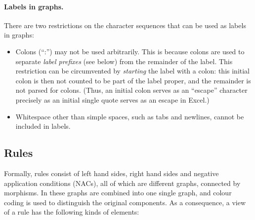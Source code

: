 \paragraph{Labels in graphs.}

There are two restrictions on the character sequences that can be used as
labels in graphs:
\begin{itemize}\noitemsep
\item Colons (``\textsf{:}'') may not be used arbitrarily. This is because
  colons are used to separate \emph{label prefixes} (see below) from the
  remainder of the label. This restriction can be circumvented by
  \emph{starting} the label with a colon: this initial colon is then not
  counted to be part of the label proper, and the remainder is not parsed for
  colons. (Thus, an initial colon serves as an ``escape'' character precisely
  as an initial single quote serves as an escape in Excel.)
\item Whitespace other than simple spaces, such as tabs and newlines, cannot be
  included in labels.
\end{itemize}

\subsection{Rules}

Formally, rules consist of left hand sides, right hand sides and negative
application conditions (NACs), all of which are different graphs, connected by
morphisms. In \Groove{} these graphs are combined into one single graph, and
colour coding is used to distinguish the original components. As a consequence,
a \Groove{} view of a rule has the following kinds of elements:

